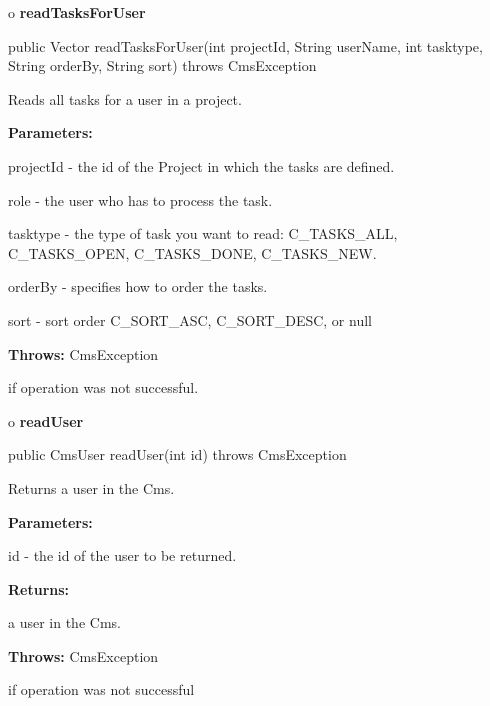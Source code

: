 o {\bf readTasksForUser}

\begin{PRE}
 public Vector readTasksForUser(int projectId,
                                String userName,
                                int tasktype,
                                String orderBy,
                                String sort) throws CmsException
\end{PRE}

\begin{description}
\htmlDD Reads all tasks for a user in a project.

\begin{description}
\item {\bf Parameters:}

projectId - the id of the Project in which the tasks are defined.

role - the user who has to process the task.

tasktype - the type of task you want to read: C\_TASKS\_ALL, C\_TASKS\_OPEN,
C\_TASKS\_DONE, C\_TASKS\_NEW.

orderBy - specifies how to order the tasks.

sort - sort order C\_SORT\_ASC, C\_SORT\_DESC, or null
\item {\bf Throws:} CmsException

if operation was not successful.
\end{description}

\end{description}

o {\bf readUser}

\begin{PRE}
 public CmsUser readUser(int id) throws CmsException
\end{PRE}

\begin{description}
\htmlDD Returns a user in the Cms.

\begin{description}
\item {\bf Parameters:}

id - the id of the user to be returned.
\item {\bf Returns:}

a user in the Cms.
\item {\bf Throws:} CmsException

if operation was not successful
\end{description}

\end{description}

